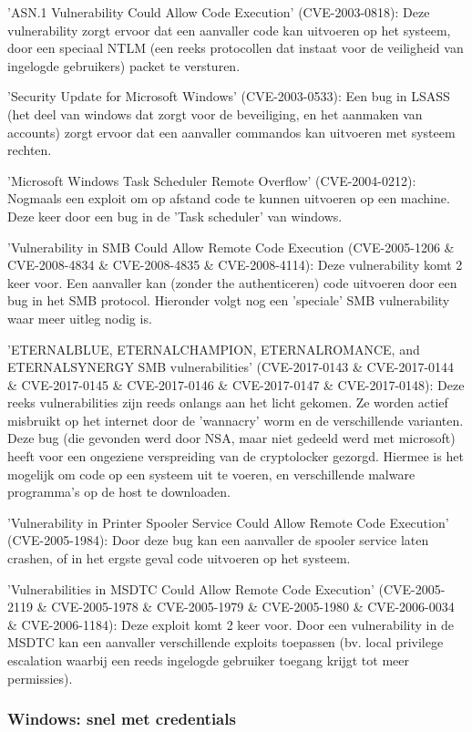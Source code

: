 'ASN.1 Vulnerability Could Allow Code Execution' (CVE-2003-0818): Deze vulnerability zorgt ervoor dat een aanvaller code kan uitvoeren op het systeem, door een speciaal NTLM (een reeks protocollen dat instaat voor de veiligheid van ingelogde gebruikers) packet te versturen.

'Security Update for Microsoft Windows' (CVE-2003-0533): Een bug in LSASS (het deel van windows dat zorgt voor de beveiliging, en het aanmaken van accounts) zorgt ervoor dat een aanvaller commandos kan uitvoeren met systeem rechten.

'Microsoft Windows Task Scheduler Remote Overflow' (CVE-2004-0212): Nogmaals een exploit om op afstand code te kunnen uitvoeren op een machine. Deze keer door een bug in de 'Task scheduler' van windows.

'Vulnerability in SMB Could Allow Remote Code Execution (CVE-2005-1206 \& CVE-2008-4834 \& CVE-2008-4835 \& CVE-2008-4114): Deze vulnerability komt 2 keer voor. Een aanvaller kan (zonder the authenticeren) code uitvoeren door een bug in het SMB protocol. Hieronder volgt nog een 'speciale' SMB vulnerability waar meer uitleg nodig is.

'ETERNALBLUE, ETERNALCHAMPION, ETERNALROMANCE, and ETERNALSYNERGY SMB vulnerabilities' (CVE-2017-0143 \& CVE-2017-0144 \& CVE-2017-0145 \& CVE-2017-0146 \& CVE-2017-0147 \& CVE-2017-0148): Deze reeks vulnerabilities zijn reeds onlangs aan het licht gekomen. Ze worden actief misbruikt op het internet door de 'wannacry' worm en de verschillende varianten. Deze bug (die gevonden werd door NSA, maar niet gedeeld werd met microsoft) heeft voor een ongeziene verspreiding van de cryptolocker gezorgd. Hiermee is het mogelijk om code op een systeem uit te voeren, en verschillende malware programma's op de host te downloaden. 

'Vulnerability in Printer Spooler Service Could Allow Remote Code Execution' (CVE-2005-1984): Door deze bug kan een aanvaller de spooler service laten crashen, of in het ergste geval code uitvoeren op het systeem.

'Vulnerabilities in MSDTC Could Allow Remote Code Execution' (CVE-2005-2119 \& CVE-2005-1978 \& CVE-2005-1979 \& CVE-2005-1980 \& CVE-2006-0034 \& CVE-2006-1184): Deze exploit komt 2 keer voor. Door een vulnerability in de MSDTC kan een aanvaller verschillende exploits toepassen (bv. local privilege escalation waarbij een reeds ingelogde gebruiker toegang krijgt tot meer permissies).
 
\subsubsection{Windows: snel met credentials}

